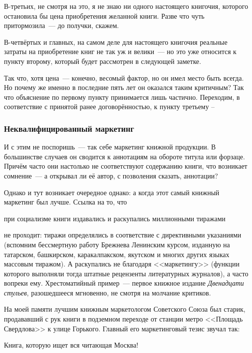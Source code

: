 В-третьих, не смотря на это, я не знаю ни одного настоящего книгочия, которого остановила бы цена приобретения желанной книги. Разве что чуть притормозила~--- до получки, скажем.

В-четвёртых и главных, на самом деле для настоящего книгочия реальные затраты на приобретение книг не так уж и велики~--- но это уже относится к пункту второму, который будет рассмотрен в следующей заметке.

Так что, хотя цена~--- конечно, весомый фактор, но он имел место быть всегда. Но почему же именно в последние пять лет он оказался таким критичным? Так что объяснение по первому пункту принимается лишь частично. Переходим, в соответствие с принятой ранее договорённостью, к пункту третьему --

\subsubsection{Неквалифицированный маркетинг}
И с этим не поспоришь~--- так себе маркетинг книжной продукции. В большинстве случаев он сводится к аннотациям на обороте титула или форзаце. Причём часто они настолько не соответствуют содержанию книги, что возникает сомнение~--- а открывал ли её автор, с позволения сказать, аннотации?

Однако и тут возникает очередное однако: а когда этот самый книжный маркетинг был лучше. Ссылка на то, что


\begin{shadequote}{}
при социализме книги издавались и раскупались миллионными тиражами
\end{shadequote}

не проходит: тиражи определялись в соответствие с директивными указаниями (вспомним бессмертную работу Брежнева Ленинским курсом, изданную на татарском, башкирском, каракалпакском, якутском и многих других языках массовым тиражом). А раскупались не благодаря <<маркетингу>> (функции которого выполняли тогда штатные рецензенты литературных журналов), а часто вопреки ему. Хрестоматийный пример~--- первое книжное издание \textit{Двенадцати стульев}, разошедшееся мгновенно, не смотря на молчание критиков.

На моей памяти лучшим книжным маркетологом Советского Союза был старик, продававший с рук книги в подземном переходе от станции метро <<Площадь Свердлова>> к улице Горького. Главный его маркетинговый тезис звучал так:


\begin{shadequote}{}
Книга, которую ищет вся читающая Москва!
\end{shadequote}


